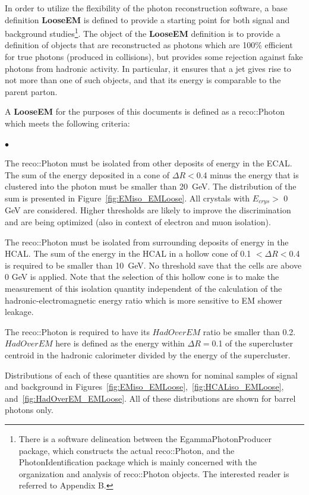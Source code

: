 \documentclass{cmspaper}
\begin{document}
In order to utilize the flexibility of the photon reconstruction software, a base definition {\bf LooseEM} 
is defined to provide a starting point for both signal and background studies\footnote{There is a software 
delineation between the EgammaPhotonProducer package, which constructs the actual reco::Photon, and the 
PhotonIdentification package which is mainly concerned with the organization and analysis of reco::Photon 
objects.  The interested reader is referred to Appendix B.}.  The object of the {\bf LooseEM} definition is 
to provide a definition of objects that are reconstructed as photons which are 100\% efficient for true photons 
(produced in collisions), but provides some rejection against fake photons from hadronic activity. In particular, 
it ensures that a jet gives rise to not more than one of such objects, and that its energy is comparable to 
the parent parton. 

A {\bf LooseEM} for the purposes of this documents is defined as a reco::Photon which meets the following criteria:
\begin{list}{$\bullet$}
 \item{The reco::Photon must be isolated from other deposits of energy in the ECAL.  The sum of the energy deposited in a cone
of $\Delta R <$0.4 minus the energy that is clustered into the photon must be smaller than 20~GeV.  The distribution of the sum is presented in 
Figure~\ref{fig:EMiso_EMLoose}. All crystals with $E_{crys} >$ 0 GeV are considered. Higher thresholds are likely to improve the discrimination
and are being optimized (also in context of electron and muon isolation).}
 \item{The reco::Photon must be isolated from surrounding deposits of energy in the HCAL.  The sum of the energy in the HCAL in
a hollow cone of 0.1 $< \Delta R<$0.4 is required to be smaller than 10~GeV.  No threshold save that the cells are above 0 GeV is applied.  
Note that the selection of this hollow cone is to make the measurement of this isolation quantity independent of the calculation of the 
hadronic-electromagnetic energy ratio which is more sensitive to EM shower leakage.}
 \item{The reco::Photon is required to have its $HadOverEM$ ratio be smaller than 0.2.  $HadOverEM$ here is defined as the energy within $\Delta R=$0.1 of the supercluster centroid in the hadronic calorimeter divided by the energy of the supercluster.}  
\end{list}

Distributions of each of these quantities are shown for nominal samples of signal and background in Figures~\ref{fig:EMiso_EMLoose},~\ref{fig:HCALiso_EMLoose}, and~\ref{fig:HadOverEM_EMLoose}.  All of these distributions are shown for barrel photons only.
\end{document}
